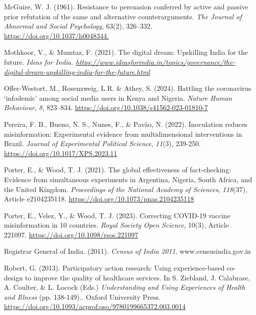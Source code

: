 \documentclass[authordate, reflection, issue]{jote-new-article}
\begin{document}
	McGuire, W. J. (1961). Resistance to persuasion conferred by active and passive prior refutation of the same and alternative counterarguments. \emph{The Journal of Abnormal and Social Psychology}, 63(2), 326--332. \url{https://doi.org/10.1037/h0048344.}



	Mothkoor, V., \& Mumtaz, F. (2021). The digital dream: Upskilling India for the future. \emph{Ideas for India. \url{https://www.ideasforindia.in/topics/governance/the-digital-dream-upskilling-india-for-the-future.html}}



	Offer-Westort, M., Rosenzweig, L.R. \& Athey, S. (2024). Battling the coronavirus ‘infodemic' among social media users in Kenya and Nigeria. \emph{Nature Human Behaviour}, \emph{8}, 823--834. \url{https://doi.org/10.1038/s41562-023-01810-7}



	Pereira, F. B., Bueno, N. S., Nunes, F., \& Pavão, N. (2022). Inoculation reduces misinformation: Experimental evidence from multidimensional interventions in Brazil. \emph{Journal of Experimental Political Science}, \emph{11}(3), 239-250. \url{https://doi.org/10.1017/XPS.2023.11}



	Porter, E., \& Wood, T. J. (2021). The global effectiveness of fact-checking: Evidence from simultaneous experiments in Argentina, Nigeria, South Africa, and the United Kingdom. \emph{Proceedings of the National Academy of Sciences}, \emph{118}(37), Article e2104235118. \url{https://doi.org/10.1073/pnas.2104235118}



	Porter, E., Velez, Y., \& Wood, T. J. (2023). Correcting COVID-19 vaccine misinformation in 10 countries. \emph{Royal Society Open Science}, 10(3), Article 221097. \url{https://doi.org/10.1098/rsos.221097}



	Registrar General of India. (2011). \emph{Census of India 2011}. www.censusindia.gov.in



	Robert, G. (2013). Participatory action research: Using experience-based co-design to improve the quality of healthcare services. In S. Ziebland, J. Calabrase, A. Coulter, \& L. Locock (Eds.) \emph{Understanding and Using Experiences of Health and Illness }(pp. 138-149)\emph{.}. Oxford University Press. \url{https://doi.org/10.1093/acprof:oso/9780199665372.003.0014}
\end{document}
